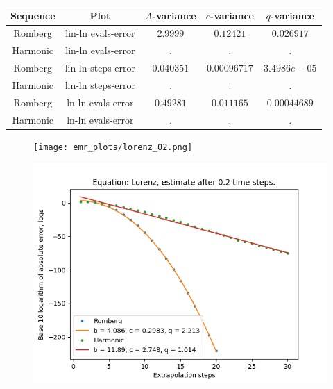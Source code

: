 \begin{table}[H]
    \centering
    \begin{tabular}{c|c||c|c|c}
Sequence & Plot & \(A\)-variance & \(c\)-variance & \(q\)-variance\\\hline
Romberg & lin-ln evals-error & \(2.9999\) & \(0.12421\) & \(0.026917\) \\
Harmonic & lin-ln evals-error & . & . & . \\
Romberg & lin-ln steps-error & \(0.040351\) & \(0.00096717\) & \(3.4986e-05\) \\
Harmonic & lin-ln steps-error & . & . & . \\
Romberg & ln-ln evals-error & \(0.49281\) & \(0.011165\) & \(0.00044689\) \\
Harmonic & ln-ln evals-error & . & . & . \\
    \end{tabular}
    \label{tab:my_label}
\end{table}

\begin{figure}[H]
\centering
\begin{minipage}{0.45\textwidth}
\centering
\texttt{[image: emr\_plots/lorenz\_02.png]}
\end{minipage}
\begin{minipage}{0.45\textwidth}
\centering
\includegraphics[scale=0.45]{emr_plots/lorenz_02_hp_steps.png}
\end{minipage}
\end{figure}

